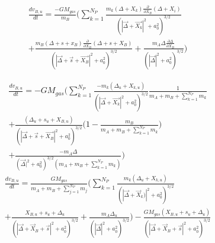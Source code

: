 \documentclass[manuscript]{aastex631}
\begin{document}
\begin{equation}
    \begin{split}
        \frac{dv_{B,u}}{dt}=\frac{-GM_{gas}}{m_B}\biggl(\sum_{k=1}^{N_P}\frac{m_k(\Delta+X_k)\frac{\partial}{\partial X_B}(\Delta+X_i)}{(|\vec{\Delta}+\vec{X_k}|^2+a_0^2)^{3/2}} \\
        +\frac{m_B(\Delta+s+x_B)\frac{\partial}{\partial X_B}(\Delta+s+X_B)}{(|\vec{\Delta}+\vec{s}+\vec{X_B}|^2+a_0^2)^{3/2}}+\frac{m_A\Delta\frac{\partial \Delta}{\partial X_B}}{(|\vec{\Delta}|^2+a_0^2)^{3/2}} \biggr)
    \end{split}
\end{equation}

\begin{equation}
    \begin{split}
        \frac{dv_{B,u}}{dt}=-GM_{gas}\biggl(\sum_{k=1}^{N_P}\frac{-m_k(\Delta_u+X_{k,u})}{(|\vec{\Delta}+\vec{X_k}|^2+a_0^2)^{3/2}}\frac{1}{m_A+m_B+\sum_{k=1}^{N_P}m_k} \\ 
        + \frac{(\Delta_u+s_u+X_{B,u})}{(|\vec{\Delta}+\vec{s}+\vec{X_B}|^2+a_0^2)^{3/2}}\bigl(1-\frac{m_B}{m_A+m_B+\sum_{k=1}^{N_P}m_k}\bigr)\\+\frac{-m_A\Delta}{(\vec{\Delta}|^2+a_0^2)^{3/2}(m_A+m_B+\sum_{k=1}^{N_P}m_k)}\biggr)
    \end{split}
\end{equation}
\begin{equation}
    \begin{split}
        \frac{dv_{B,u}}{dt} = \frac{GM_{gas}}{m_A+m_B+\sum_{j=1}^{N_P}m_j}\biggl(\sum_{k=1}^{N_P}\frac{m_k(\Delta_u+X_{k,u})}{(|\vec{\Delta}+\vec{X}_k)|^2+a_0^2)^{3/2}}\\ 
        + \frac{X_{B,u}+s_u+\Delta_u}{(|\vec{\Delta}+\vec{X}_B+\vec{s}|^2+a_0^2)^{3/2}} +\frac{m_A\Delta_u}{(|\vec{\Delta}|^2+a_0^2)^{3/2}}\biggr) - 
        \frac{GM_{gas}(X_{B,u}+s_u+\Delta_u)}{(|\vec{\Delta}+\vec{X}_B+\vec{s}|^2+a_0^2)^{3/2}}
    \end{split}
\end{equation}
\end{document}
